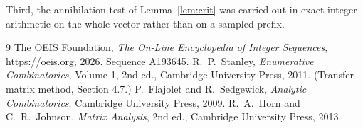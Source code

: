 \documentclass[11pt,a4paper]{article}
\theoremstyle{plain}
\theoremstyle{definition}
\begin{document}
Third, the annihilation test of Lemma~\ref{lem:crit} was carried out in exact integer
arithmetic on the whole vector rather than on a sampled prefix.

\begin{thebibliography}{9}
 The OEIS Foundation, \emph{The On-Line Encyclopedia of Integer
Sequences}, \url{https://oeis.org}, 2026. Sequence A193645.
 R.~P.~Stanley, \emph{Enumerative Combinatorics}, Volume 1, 2nd ed.,
Cambridge University Press, 2011. (Transfer-matrix method, Section 4.7.)
 P.~Flajolet and R.~Sedgewick, \emph{Analytic Combinatorics}, Cambridge
University Press, 2009.
 R.~A.~Horn and C.~R.~Johnson, \emph{Matrix Analysis}, 2nd ed., Cambridge
University Press, 2013.
\end{thebibliography}
\end{document}

